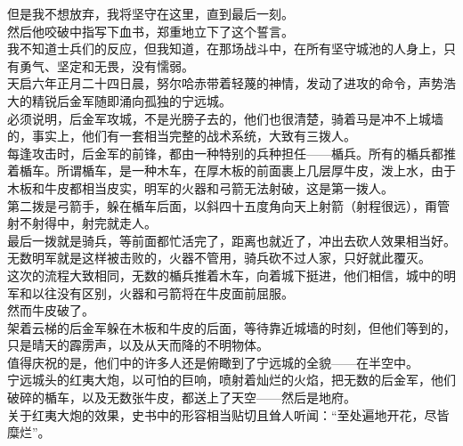\begin{multicols}{\theparacolNo}
但是我不想放弃，我将坚守在这里，直到最后一刻。\\

然后他咬破中指写下血书，郑重地立下了这个誓言。\\

我不知道士兵们的反应，但我知道，在那场战斗中，在所有坚守城池的人身上，只有勇气、坚定和无畏，没有懦弱。\\

天启六年正月二十四日晨，努尔哈赤带着轻蔑的神情，发动了进攻的命令，声势浩大的精锐后金军随即涌向孤独的宁远城。\\

必须说明，后金军攻城，不是光膀子去的，他们也很清楚，骑着马是冲不上城墙的，事实上，他们有一套相当完整的战术系统，大致有三拨人。\\

每逢攻击时，后金军的前锋，都由一种特别的兵种担任——楯兵。所有的楯兵都推着楯车。所谓楯车，是一种木车，在厚木板的前面裹上几层厚牛皮，泼上水，由于木板和牛皮都相当皮实，明军的火器和弓箭无法射破，这是第一拨人。\\

第二拨是弓箭手，躲在楯车后面，以斜四十五度角向天上射箭（射程很远），甭管射不射得中，射完就走人。\\

最后一拨就是骑兵，等前面都忙活完了，距离也就近了，冲出去砍人效果相当好。\\

无数明军就是这样被击败的，火器不管用，骑兵砍不过人家，只好就此覆灭。\\

这次的流程大致相同，无数的楯兵推着木车，向着城下挺进，他们相信，城中的明军和以往没有区别，火器和弓箭将在牛皮面前屈服。\\

然而牛皮破了。\\

架着云梯的后金军躲在木板和牛皮的后面，等待靠近城墙的时刻，但他们等到的，只是晴天的霹雳声，以及从天而降的不明物体。\\

值得庆祝的是，他们中的许多人还是俯瞰到了宁远城的全貌——在半空中。\\

宁远城头的红夷大炮，以可怕的巨响，喷射着灿烂的火焰，把无数的后金军，他们破碎的楯车，以及无数张牛皮，都送上了天空——然后是地府。\\

关于红夷大炮的效果，史书中的形容相当贴切且耸人听闻：“至处遍地开花，尽皆糜烂”。\\


\end{multicols}
